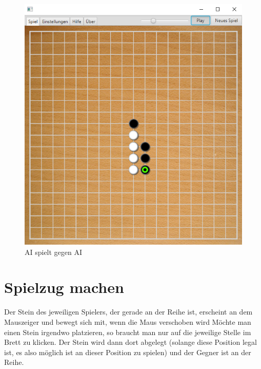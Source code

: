 \documentclass[11pt]{article}
\newcommand{\1}{{\mathds{1}}}
\newcommand{\imagewidth}{.6\textheight}%
\begin{document}
	\begin{figure}[h]
		\centering
		\includegraphics[width=\imagewidth]{ai.png}
		\caption{AI spielt gegen AI}
		\label{ai}
	\end{figure}

	\FloatBarrier	
	\section{Spielzug machen}
	
	Der Stein des jeweiligen Spielers, der gerade an der Reihe ist, erscheint an dem Mauszeiger und bewegt sich mit, wenn die Maus verschoben wird
	Möchte man einen Stein irgendwo platzieren, so braucht man nur auf die jeweilige Stelle im Brett zu klicken.
	Der Stein wird dann dort abgelegt (solange diese Position legal ist, es also möglich ist an dieser Position zu spielen) und der Gegner ist an der Reihe. 
\end{document}
